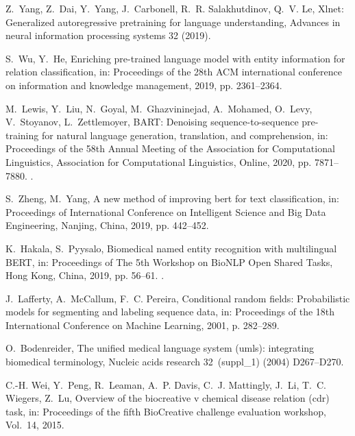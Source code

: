 \documentclass[preprint,12pt]{elsarticle}
\begin{document}
\begin{thebibliography}{10}
Z.~Yang, Z.~Dai, Y.~Yang, J.~Carbonell, R.~R. Salakhutdinov, Q.~V. Le, Xlnet:
  Generalized autoregressive pretraining for language understanding, Advances
  in neural information processing systems 32 (2019).

S.~Wu, Y.~He, Enriching pre-trained language model with entity information for
  relation classification, in: Proceedings of the 28th ACM international
  conference on information and knowledge management, 2019, pp. 2361--2364.

M.~Lewis, Y.~Liu, N.~Goyal, M.~Ghazvininejad, A.~Mohamed, O.~Levy, V.~Stoyanov,
  L.~Zettlemoyer, {BART}: Denoising sequence-to-sequence pre-training for
  natural language generation, translation, and comprehension, in: Proceedings
  of the 58th Annual Meeting of the Association for Computational Linguistics,
  Association for Computational Linguistics, Online, 2020, pp. 7871--7880.
\newblock \href {https://doi.org/10.18653/v1/2020.acl-main.703}
  {}.

S.~Zheng, M.~Yang, A new method of improving bert for text classification, in:
  Proceedings of International Conference on Intelligent Science and Big Data
  Engineering, Nanjing, China, 2019, pp. 442--452.

K.~Hakala, S.~Pyysalo, Biomedical named entity recognition with multilingual
  {BERT}, in: Proceedings of The 5th Workshop on BioNLP Open Shared Tasks, Hong
  Kong, China, 2019, pp. 56--61.
\newblock \href {https://doi.org/10.18653/v1/D19-5709}
  {}.

J.~Lafferty, A.~McCallum, F.~C. Pereira, Conditional random fields:
  Probabilistic models for segmenting and labeling sequence data, in:
  Proceedings of the 18th International Conference on Machine Learning, 2001,
  p. 282–289.

O.~Bodenreider, The unified medical language system (umls): integrating
  biomedical terminology, Nucleic acids research 32~(suppl\_1) (2004)
  D267--D270.

C.-H. Wei, Y.~Peng, R.~Leaman, A.~P. Davis, C.~J. Mattingly, J.~Li, T.~C.
  Wiegers, Z.~Lu, Overview of the biocreative v chemical disease relation (cdr)
  task, in: Proceedings of the fifth BioCreative challenge evaluation workshop,
  Vol.~14, 2015.


\end{thebibliography}
\end{document}
